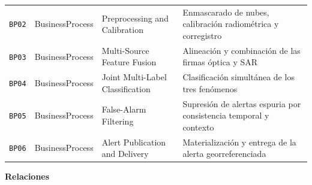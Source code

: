 \documentclass{article}
\newcommand{\mdhfour}[1]{\par\medskip\noindent\textbf{#1}\par\nobreak\smallskip}
\begin{document}
{\begin{longtable}{@{}L{0.40in}L{1.35in}L{1.42in}L{2.77in}@{}}
\texttt{BP02} & BusinessProcess & Preprocessing and Calibration & Enmascarado de nubes, calibración radiométrica y corregistro \\
\texttt{BP03} & BusinessProcess & Multi-Source Feature Fusion & Alineación y combinación de las firmas óptica y SAR \\
\texttt{BP04} & BusinessProcess & Joint Multi-Label Classification & Clasificación simultánea de los tres fenómenos \\
\texttt{BP05} & BusinessProcess & False-Alarm Filtering & Supresión de alertas espuria por consistencia temporal y contexto \\
\texttt{BP06} & BusinessProcess & Alert Publication and Delivery & Materialización y entrega de la alerta georreferenciada \\
\end{longtable}
}

\mdhfour{Relaciones}
\end{document}

